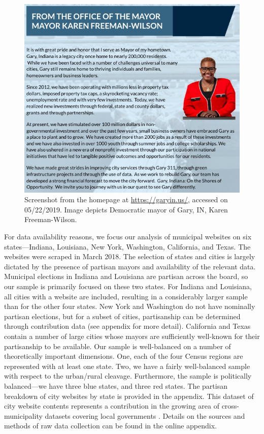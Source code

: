 \documentclass[11pt]{article}
\begin{document}
\begin{figure}
\centering
\includegraphics[scale=0.45]{figures/gary_hp}
\caption{Screenshot from the homepage at \url{https://garyin.us/}, accessed on 05/22/2019. Image depicts Democratic mayor of Gary, IN, Karen Freeman-Wilson.} \vspace{-.3cm}
\label{fig:garymayor}
\end{figure}

For data availability reasons, we focus our analysis of municipal websites on six states---Indiana, Louisiana, New York, Washington, California, and Texas. The websites were scraped in March 2018. The selection of states and cities is largely dictated by the presence of partisan mayors and availability of the relevant data. Municipal elections in Indiana and Louisiana are partisan across the board, so our sample is primarily focused on these two states. For Indiana and Louisiana, all cities with a website are included, resulting in a considerably larger sample than for the other four states. New York and Washington do not have nominally partisan elections, but for a subset of cities, partisanship can be determined through contribution data (see appendix for more detail). California and Texas contain a number of large cities whose mayors are sufficiently well-known for their partisanship to be available. Our sample is well-balanced on a number of theoretically important dimensions. One, each of the four Census regions are represented with at least one state. Two, we have a fairly well-balanced sample with respect to the urban/rural cleavage. Furthermore, the sample is politically balanced---we have three blue states, and three red states.  The partisan breakdown of city websites by state is provided in the appendix. This dataset of city website contents represents a contribution in the growing area of cross-municipality datasets covering local governments \citep[e.g., ][]{marschall2013local,sumner2020crowdsourcing}. Details on the sources and methods of raw data collection can be found in the online appendix.
\end{document}
